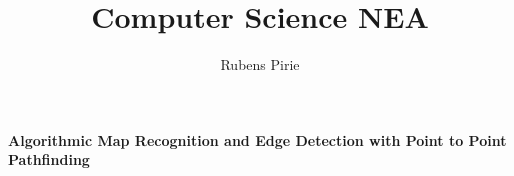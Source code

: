 \documentclass{article}
\title{Computer Science NEA}
\author{Rubens Pirie}
\begin{document}
    
    \begin{titlepage}
        \begin{center}
            \huge \textbf{Algorithmic Map Recognition and Edge Detection with Point to Point Pathfinding}
        \end{center}
    \end{titlepage}

    
    \setcounter{tocdepth}{5}
    \tableofcontents

    
    
    
    
    
\end{document}
